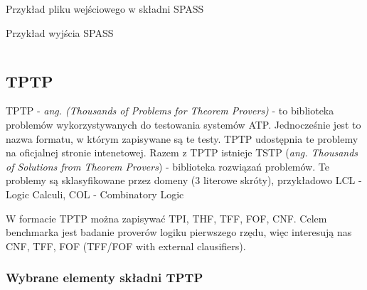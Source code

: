 \documentclass[a4paper,12pt]{article}
\newenvironment{longlisting}{\captionsetup{type=listing}}{}
\begin{document}
\begin{longlisting}
  \caption{Przykład pliku wejściowego w składni SPASS}
\end{longlisting}

\begin{longlisting}
  \caption{Przykład wyjścia SPASS}
  \inputminted{text}{listings/spass_example.out}
\end{longlisting}

\subsection{TPTP}

TPTP - \textit{ang. (Thousands of Problems for Theorem Provers)} - to biblioteka problemów wykorzystywanych do testowania systemów \gls{ATP}. Jednocześnie jest to nazwa formatu, w którym zapisywane są te testy. TPTP udostępnia te problemy na oficjalnej stronie intenetowej. Razem z TPTP istnieje TSTP (\textit{ang. Thousands of Solutions from Theorem Provers}) - biblioteka rozwiązań problemów.
Te problemy są sklasyfikowane przez domeny (3 literowe skróty), przykładowo LCL - Logic Calculi, COL - Combinatory Logic

W formacie TPTP można zapisywać \gls{TPI}, \gls{THF}, \gls{TFF}, \gls{FOF}, \gls{CNF}. Celem benchmarka jest badanie proverów logiku pierwszego rzędu, więc interesują nas \gls{CNF}, \gls{TFF}, \gls{FOF} (TFF/FOF with external clausifiers).

\subsubsection{Wybrane elementy składni TPTP}
\end{document}
